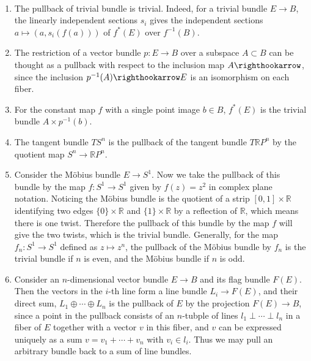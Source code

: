 \begin{exmp}
~\begin{enumerate}
\item The pullback of trivial bundle is trivial. Indeed, for a trivial bundle $E\rightarrow B$, the linearly independent sections $s_i$ gives the independent sections $a\mapsto (a,s_i(f(a)))$ of $f^*(E)$ over $f^{-1}(B)$.
\item The restriction of a vector bundle $p:E\rightarrow B$ over a subspace $A\subset B$ can be thought as a pullback with respect to the inclusion map $A\righthookarrow$, since the inclusion $p^{-1}(A)\righthookarrow E$ is an isomorphism on each fiber.
\item For the constant map $f$ with a single point image $b\in B$, $f^*(E)$ is the trivial bundle $A\times p^{-1}(b)$.
\item The tangent bundle $TS^n$ is the pullback of the tangent bundle $T\mathbb{R}P^n$ by the quotient map $S^n\rightarrow \mathbb{R}P^n$.
\item Consider the M{\"o}bius bundle $E\rightarrow S^1$. Now we take the pullback of this bundle by the map $f:S^1\rightarrow S^1$ given by $f(z)=z^2$ in complex plane notation. Noticing the M{\"o}bius bundle is the quotient of a strip $[0,1]\times \mathbb{R}$ identifying two edges $\{0\}\times \mathbb{R}$ and $\{1\}\times \mathbb{R}$ by a reflection of $\mathbb{R}$, which means there is one twist. Therefore the pullback of this bundle by the map $f$ will give the two twists, which is the trivial bundle. Generally, for the map $f_n:S^1\rightarrow S^1$ defined as $z\mapsto z^n$, the pullback of the M{\"o}bius bundle by $f_n$ is the trivial bundle if $n$ is even, and the M{\"o}bius bundle if $n$ is odd.
\item Consider an $n$-dimensional vector bundle $E\rightarrow B$ and its flag bundle $F(E)$. Then the vectors in the $i$-th line form a line bundle $L_i\rightarrow F(E)$, and their direct sum, $L_1\oplus\cdots\oplus L_n$ is the pullback of $E$ by the projection $F(E)\rightarrow B$, since a point in the pullback consists of an $n$-tubple of lines $l_1\perp \cdots \perp l_n$ in a fiber of $E$ together with a vector $v$ in this fiber, and $v$ can be expressed uniquely as a sum $v=v_1+\cdots+v_n$ with $v_i\in l_i$. Thus we may pull an arbitrary bundle back to a sum of line bundles.
\end{enumerate}
\end{exmp}

